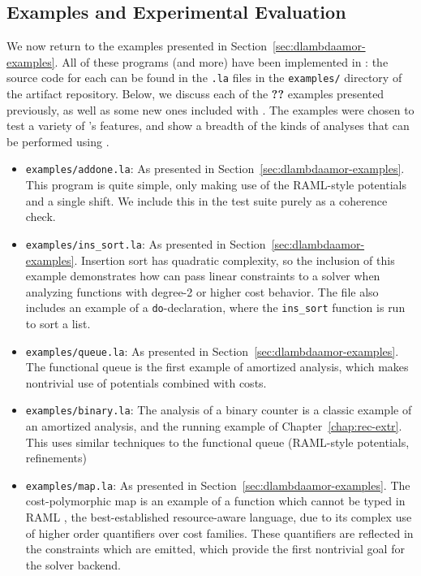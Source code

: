 \subsection{Examples and Experimental Evaluation}
We now return to the examples presented in Section~\ref{sec:dlambdaamor-examples}. All of these programs (and more) have been implemented in \lambdaamorimpl: the source code for each can be found in the \texttt{.la} files in the \texttt{examples/} directory of the artifact repository. Below, we discuss each of the \textbf{??} examples presented previously, as well as some new ones included with \lambdaamorimpl. The examples were chosen to test a variety of \lambdaamorimpl's features, and show a breadth of the kinds of analyses that can be performed using \lambdaamorimpl.

\begin{itemize}
  \item \texttt{examples/addone.la}: As presented in Section~\ref{sec:dlambdaamor-examples}. This program is quite simple, only making use of the RAML-style potentials and a single shift. We include this in the test suite purely as a coherence check.
  \item \texttt{examples/ins_sort.la}: As presented in Section~\ref{sec:dlambdaamor-examples}. Insertion sort has quadratic complexity, so the inclusion of this example demonstrates how \lambdaamorimpl can pass linear constraints to a solver when analyzing functions with degree-2 or higher cost behavior. The file also includes an example of a \texttt{do}-declaration, where the \texttt{ins_sort} function is run to sort a list.
  \item \texttt{examples/queue.la}: As presented in Section~\ref{sec:dlambdaamor-examples}. The functional queue is the first example of amortized analysis, which makes nontrivial use of potentials combined with costs.
  \item \texttt{examples/binary.la}: The analysis of a binary counter is a classic example of an amortized analysis, and the running example of Chapter~\ref{chap:rec-extr}. This uses similar techniques to the functional queue (RAML-style potentials, refinements)
  \item \texttt{examples/map.la}: As presented in Section~\ref{sec:dlambdaamor-examples}. The cost-polymorphic map is an example of a function which cannot be typed in RAML \citehere, the best-established resource-aware language, due to its complex use of higher order quantifiers over cost families. These quantifiers are reflected in the constraints which are emitted, which provide the first nontrivial goal for the solver backend.

\end{itemize}
